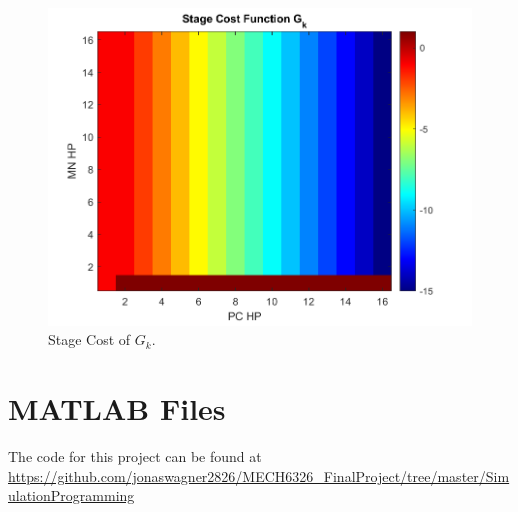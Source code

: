 \documentclass[letterpaper, 10 pt, conference]{ieeeconf}
\begin{document}
\begin{figure}[thb]
    \centering
    \includegraphics[scale =0.44]{figs/DND_StageCost_G_k.png}
    \caption{Stage Cost of $G_k$.}
    \label{fig:G_k_vis}
\end{figure}



{}


\appendix
\section{MATLAB Files}
\label{apx:matlab}
The code for this project can be found at 
\url{https://github.com/jonaswagner2826/MECH6326_FinalProject/tree/master/SimulationProgramming}
\end{document}
